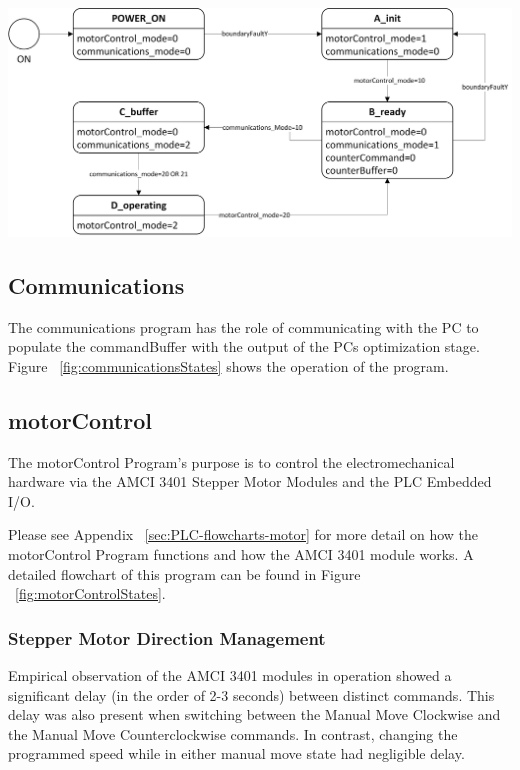 		\begin{center}
				\includegraphics[width=\textwidth]{figures/cncMachine/governor}
				\label{fig:governor}
		\end{center}


\subsection{Communications}
	
	The communications program has the role of communicating with the PC to populate the commandBuffer with the output of the PCs optimization stage. Figure ~\ref{fig:communicationsStates} shows the operation of the program.

\subsection{motorControl}
	
	The motorControl Program's purpose is to control the electromechanical hardware via the AMCI 3401 Stepper Motor Modules and the PLC Embedded I/O. 
	
	Please see Appendix ~\ref{sec:PLC-flowcharts-motor} for more detail on how the motorControl Program functions and how the AMCI 3401 module works. A detailed flowchart of this program can be found in Figure ~\ref{fig:motorControlStates}.

	\subsubsection{Stepper Motor Direction Management}	
			Empirical observation of the AMCI 3401 modules in operation showed a significant delay (in the order of 2-3 seconds) between distinct commands. This delay was also present when switching between the Manual Move Clockwise and the Manual Move Counterclockwise commands. In contrast, changing the programmed speed while in either manual move state had negligible delay.
			
